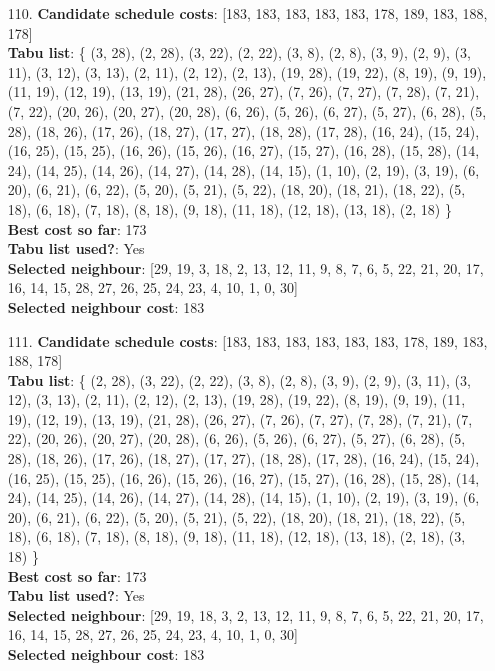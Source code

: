\documentclass[fleqn]{article}
\begin{document}
\begin{itemize}
    \item[110.] \textbf{Candidate schedule costs}: [183, 183, 183, 183, 183, 178, 189, 183, 188, 178] \\
    \textbf{Tabu list}: \{ (3, 28), (2, 28), (3, 22), (2, 22), (3, 8), (2, 8), (3, 9), (2, 9), (3, 11), (3, 12), (3, 13), (2, 11), (2, 12), (2, 13), (19, 28), (19, 22), (8, 19), (9, 19), (11, 19), (12, 19), (13, 19), (21, 28), (26, 27), (7, 26), (7, 27), (7, 28), (7, 21), (7, 22), (20, 26), (20, 27), (20, 28), (6, 26), (5, 26), (6, 27), (5, 27), (6, 28), (5, 28), (18, 26), (17, 26), (18, 27), (17, 27), (18, 28), (17, 28), (16, 24), (15, 24), (16, 25), (15, 25), (16, 26), (15, 26), (16, 27), (15, 27), (16, 28), (15, 28), (14, 24), (14, 25), (14, 26), (14, 27), (14, 28), (14, 15), (1, 10), (2, 19), (3, 19), (6, 20), (6, 21), (6, 22), (5, 20), (5, 21), (5, 22), (18, 20), (18, 21), (18, 22), (5, 18), (6, 18), (7, 18), (8, 18), (9, 18), (11, 18), (12, 18), (13, 18), (2, 18) \} \\
    \textbf{Best cost so far}: 173 \\
    \textbf{Tabu list used?}: Yes \\
    \textbf{Selected neighbour}: [29, 19, 3, 18, 2, 13, 12, 11, 9, 8, 7, 6, 5, 22, 21, 20, 17, 16, 14, 15, 28, 27, 26, 25, 24, 23, 4, 10, 1, 0, 30] \\
    \textbf{Selected neighbour cost}: 183
      

    \item[111.] \textbf{Candidate schedule costs}: [183, 183, 183, 183, 183, 183, 178, 189, 183, 188, 178] \\
    \textbf{Tabu list}: \{ (2, 28), (3, 22), (2, 22), (3, 8), (2, 8), (3, 9), (2, 9), (3, 11), (3, 12), (3, 13), (2, 11), (2, 12), (2, 13), (19, 28), (19, 22), (8, 19), (9, 19), (11, 19), (12, 19), (13, 19), (21, 28), (26, 27), (7, 26), (7, 27), (7, 28), (7, 21), (7, 22), (20, 26), (20, 27), (20, 28), (6, 26), (5, 26), (6, 27), (5, 27), (6, 28), (5, 28), (18, 26), (17, 26), (18, 27), (17, 27), (18, 28), (17, 28), (16, 24), (15, 24), (16, 25), (15, 25), (16, 26), (15, 26), (16, 27), (15, 27), (16, 28), (15, 28), (14, 24), (14, 25), (14, 26), (14, 27), (14, 28), (14, 15), (1, 10), (2, 19), (3, 19), (6, 20), (6, 21), (6, 22), (5, 20), (5, 21), (5, 22), (18, 20), (18, 21), (18, 22), (5, 18), (6, 18), (7, 18), (8, 18), (9, 18), (11, 18), (12, 18), (13, 18), (2, 18), (3, 18) \} \\
    \textbf{Best cost so far}: 173 \\
    \textbf{Tabu list used?}: Yes \\
    \textbf{Selected neighbour}: [29, 19, 18, 3, 2, 13, 12, 11, 9, 8, 7, 6, 5, 22, 21, 20, 17, 16, 14, 15, 28, 27, 26, 25, 24, 23, 4, 10, 1, 0, 30] \\
    \textbf{Selected neighbour cost}: 183
      


\end{itemize}
\end{document}

